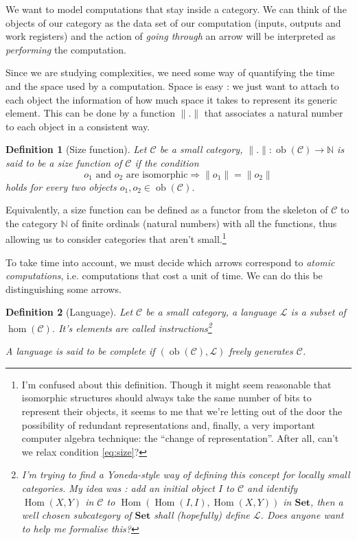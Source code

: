 \documentclass{article}
\newcommand{\cat}[1]{\mathscr{#1}}
\newcommand{\lcat}[1]{\mathbf{#1}}
\newcommand{\C}{\cat{C}}
\renewcommand{\L}{\cat{L}}
\newcommand{\size}[1]{\lVert#1\rVert}
\DeclareMathOperator{\ob}{ob}
\DeclareMathOperator{\Hom}{Hom}
\newcommand{\N}{\mathbb{N}}
\newtheorem{definition}{Definition}
\begin{document}
  We want to model computations that stay inside a category. We can
  think of the objects of our category as the data set of our
  computation (inputs, outputs and work registers) and the action of
  \emph{going through} an arrow will be interpreted as
  \emph{performing} the computation.
  
  Since we are studying complexities, we need some way of quantifying
  the time and the space used by a computation. Space is easy : we
  just want to attach to each object the information of how much space
  it takes to represent its generic element. This can be done by a
  function $\size{.}$ that associates a natural number to each object
  in a consistent way.

  \begin{definition}[Size function]
    Let $\C$ be a small category, $\size{.} : \ob(\C) \rightarrow \N$ is
    said to be a \emph{size function} of $\C$ if the condition
    \begin{equation}
      \label{eq:size}
      o_1 \text{ and } o_2 \text{ are isomorphic}
      \Rightarrow \size{o_1} = \size{o_2}
    \end{equation}
    holds for every two objects $o_1,o_2\in\ob(\C)$.
  \end{definition}
  
  Equivalently, a size function can be defined as a functor from the
  skeleton of $\C$ to the category $\N$ of finite ordinals (natural
  numbers) with all the functions, thus allowing us to consider
  categories that aren't small.\footnote{I'm confused about this
  definition. Though it might seem reasonable that isomorphic
  structures should always take the same number of bits to represent
  their objects, it seems to me that we're letting out of the door the
  possibility of redundant representations and, finally, a very
  important computer algebra technique: the ``change of
  representation''. After all, can't we relax condition
  \eqref{eq:size}?}

  To take time into account, we must decide which arrows correspond to
  \emph{atomic computations}, i.e. computations that cost a unit of
  time. We can do this be distinguishing some arrows.

  \begin{definition}[Language]
    Let $\C$ be a small category, a language $\L$ is a subset of
    $\hom(\C)$. It's elements are called
    \emph{instructions}\footnote{I'm trying to find a Yoneda-style way
    of defining this concept for locally small categories. My idea was
    : add an initial object $I$ to $\C$ and identify $\Hom(X,Y)$ in
    $\C$ to $\Hom\left(\Hom(I,I), \Hom(X,Y)\right)$ in $\lcat{Set}$,
    then a well chosen subcategory of $\lcat{Set}$ shall (hopefully)
    define $\L$. Does anyone want to help me formalise this?}
    
    A language is said to be \emph{complete} if $(\ob(\C),\L)$ freely
    generates $\C$.
  \end{definition}
\end{document}
